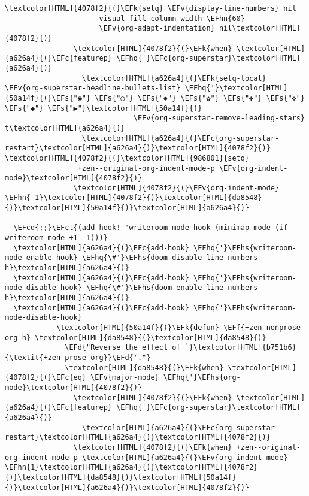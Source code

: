 \documentclass{scrartcl}
\newcommand{\EFk}[1]{\textcolor{EFk}{#1}} %
\newcommand{\EFd}[1]{\textcolor{EFd}{\textit{#1}}} %
\newcommand{\EFs}[1]{\textcolor{EFs}{#1}} %
\newcommand{\EFct}[1]{\textcolor{EFct}{#1}} %
\newcommand{\EFc}[1]{\textcolor{EFc}{#1}} %
\newcommand{\EFv}[1]{\textcolor{EFv}{#1}} %
\newcommand{\EFf}[1]{\textcolor{EFf}{#1}} %
\newcommand{\EFcd}[1]{\textcolor{EFcd}{#1}} %
\newcommand{\EFhn}[1]{\textcolor{EFhn}{\textbf{#1}}} %
\newcommand{\EFhq}[1]{\textcolor{EFhq}{#1}} %
\newcommand{\EFhs}[1]{\textcolor{EFhs}{#1}} %
\begin{document}
\begin{Code}
\begin{Verbatim}[]
                \textcolor[HTML]{4078f2}{(}\EFk{setq} \EFv{display-line-numbers} nil
                      visual-fill-column-width \EFhn{60}
                      \EFv{org-adapt-indentation} nil\textcolor[HTML]{4078f2}{)}
                \textcolor[HTML]{4078f2}{(}\EFk{when} \textcolor[HTML]{a626a4}{(}\EFc{featurep} \EFhq{'}\EFc{org-superstar}\textcolor[HTML]{a626a4}{)}
                  \textcolor[HTML]{a626a4}{(}\EFk{setq-local} \EFv{org-superstar-headline-bullets-list} \EFhq{'}\textcolor[HTML]{50a14f}{(}\EFs{"◉"} \EFs{"○"} \EFs{"✸"} \EFs{"✿"} \EFs{"✤"} \EFs{"✜"} \EFs{"◆"} \EFs{"▶"}\textcolor[HTML]{50a14f}{)}
                              \EFv{org-superstar-remove-leading-stars} t\textcolor[HTML]{a626a4}{)}
                  \textcolor[HTML]{a626a4}{(}\EFc{org-superstar-restart}\textcolor[HTML]{a626a4}{)}\textcolor[HTML]{4078f2}{)}               \textcolor[HTML]{4078f2}{(}\textcolor[HTML]{986801}{setq}
                 +zen--original-org-indent-mode-p \EFv{org-indent-mode}\textcolor[HTML]{4078f2}{)}
                \textcolor[HTML]{4078f2}{(}\EFv{org-indent-mode} \EFhn{-1}\textcolor[HTML]{4078f2}{)}\textcolor[HTML]{da8548}{)}\textcolor[HTML]{50a14f}{)}\textcolor[HTML]{a626a4}{)}

  \EFcd{;;}\EFct{(add-hook! 'writeroom-mode-hook (minimap-mode (if writeroom-mode +1 -1)))}
  \textcolor[HTML]{a626a4}{(}\EFc{add-hook} \EFhq{'}\EFhs{writeroom-mode-enable-hook} \EFhq{\#'}\EFhs{doom-disable-line-numbers-h}\textcolor[HTML]{a626a4}{)}
  \textcolor[HTML]{a626a4}{(}\EFc{add-hook} \EFhq{'}\EFhs{writeroom-mode-disable-hook} \EFhq{\#'}\EFhs{doom-enable-line-numbers-h}\textcolor[HTML]{a626a4}{)}
  \textcolor[HTML]{a626a4}{(}\EFc{add-hook} \EFhq{'}\EFhs{writeroom-mode-disable-hook}
            \textcolor[HTML]{50a14f}{(}\EFk{defun} \EFf{+zen-nonprose-org-h} \textcolor[HTML]{da8548}{(}\textcolor[HTML]{da8548}{)}
              \EFd{"Reverse the effect of `}\textcolor[HTML]{b751b6}{\textit{+zen-prose-org}}\EFd{'."}
              \textcolor[HTML]{da8548}{(}\EFk{when} \textcolor[HTML]{4078f2}{(}\EFc{eq} \EFv{major-mode} \EFhq{'}\EFhs{org-mode}\textcolor[HTML]{4078f2}{)}
                \textcolor[HTML]{4078f2}{(}\EFk{when} \textcolor[HTML]{a626a4}{(}\EFc{featurep} \EFhq{'}\EFc{org-superstar}\textcolor[HTML]{a626a4}{)}
                  \textcolor[HTML]{a626a4}{(}\EFc{org-superstar-restart}\textcolor[HTML]{a626a4}{)}\textcolor[HTML]{4078f2}{)}
                \textcolor[HTML]{4078f2}{(}\EFk{when} +zen--original-org-indent-mode-p \textcolor[HTML]{a626a4}{(}\EFv{org-indent-mode} \EFhn{1}\textcolor[HTML]{a626a4}{)}\textcolor[HTML]{4078f2}{)}\textcolor[HTML]{da8548}{)}\textcolor[HTML]{50a14f}{)}\textcolor[HTML]{a626a4}{)}\textcolor[HTML]{4078f2}{)}
\end{Verbatim}
\end{Code}
\end{document}
